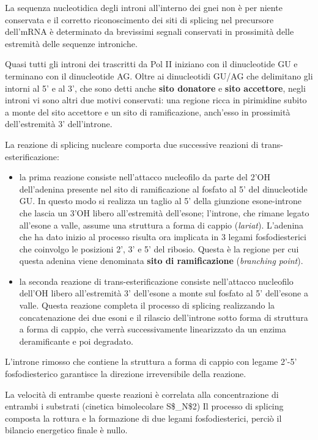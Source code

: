 \documentclass[11pt]{book}
\begin{document}
La sequenza nucleotidica degli introni all'interno dei gnei non è per
niente conservata e il corretto riconoscimento dei siti di splicing nel
precursore dell'mRNA è determinato da brevissimi segnali conservati in
prossimità delle estremità delle sequenze introniche.

Quasi tutti gli introni dei trascritti da Pol II iniziano con il
dinucleotide GU e terminano con il dinucleotide AG. Oltre ai
dinucleotidi GU/AG che delimitano gli intorni al 5' e al 3', che sono
detti anche \textbf{sito donatore} e \textbf{sito accettore}, negli
introni vi sono altri due motivi conservati: una regione ricca in
pirimidine subito a monte del sito accettore e un sito di ramificazione,
anch'esso in prossimità dell'estremità 3' dell'introne.

La reazione di splicing nucleare comporta due successive reazioni di
trans-esterificazione:

\begin{itemize}
\itemsep1pt\parskip0pt
\item
  la prima reazione consiste nell'attacco nucleofilo da parte del 2'OH
  dell'adenina presente nel sito di ramificazione al fosfato al 5' del
  dinucleotide GU. In questo modo si realizza un taglio al 5' della
  giunzione esone-introne che lascia un 3'OH libero all'estremità
  dell'esone; l'introne, che rimane legato all'esone a valle, assume una
  struttura a forma di cappio (\emph{lariat}). L'adenina che ha dato
  inizio al processo risulta ora implicata in 3 legami fosfodiesterici
  che coinvolgo le posizioni 2', 3' e 5' del ribosio. Questa è la
  regione per cui questa adenina viene denominata \textbf{sito di
  ramificazione} (\emph{branching point}).
\item
  la seconda reazione di trans-esterificazione consiste nell'attacco
  nucleofilo dell'OH libero all'estremità 3' dell'esone a monte sul
  fosfato al 5' dell'esone a valle. Questa reazione completa il processo
  di splicing realizzando la concatenazione dei due esoni e il rilascio
  dell'introne sotto forma di struttura a forma di cappio, che verrà
  successivamente linearizzato da un enzima deramificante e poi
  degradato.
\end{itemize}

L'introne rimosso che contiene la struttura a forma di cappio con legame
2'-5' fosfodiesterico garantisce la direzione irreversibile della
reazione.

La velocità di entrambe queste reazioni è correlata alla concentrazione
di entrambi i substrati (cinetica bimolecolare S\$\_N\$2) Il processo di
splicing composta la rottura e la formazione di due legami
fosfodiesterici, perciò il bilancio energetico finale è nullo.
\end{document}
